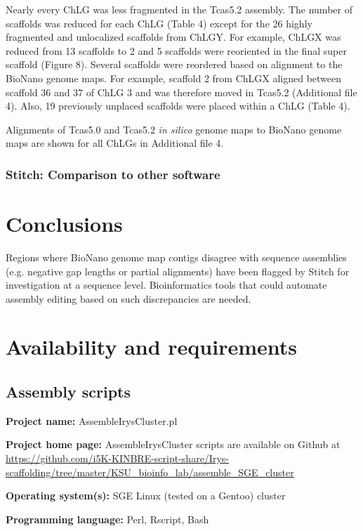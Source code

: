 \documentclass{bmcart}
\begin{document}
Nearly every ChLG was less fragmented in the Tcas5.2 assembly. The number of scaffolds was reduced for each ChLG (Table 4) except for the 26 highly fragmented and unlocalized scaffolds from ChLGY. For example, ChLGX was reduced from 13 scaffolds to 2 and 5 scaffolds were reoriented in the final super scaffold (Figure 8). Several scaffolds were reordered based on alignment to the BioNano genome maps. For example, scaffold 2 from ChLGX aligned between scaffold 36 and 37 of ChLG 3 and was therefore moved in Tcas5.2 (Additional file 4). Also, 19 previously unplaced scaffolds were placed within a ChLG (Table 4). 
 
Alignments of Tcas5.0 and Tcas5.2 \textit{in silico} genome maps to BioNano genome maps are shown for all ChLGs in Additional file 4.

\subsubsection*{Stitch: Comparison to other software}

\section*{Conclusions}

Regions where BioNano genome map contigs disagree with sequence assemblies (e.g. negative gap lengths or partial alignments) have been flagged by Stitch for investigation at a sequence level. Bioinformatics tools that could automate assembly editing based on such discrepancies are needed. 

\section*{Availability and requirements}

\subsection*{\textbf{Assembly scripts}}

\textbf{Project name:} AssembleIrysCluster.pl

\textbf{Project home page:} AssembleIrysCluster scripts are available on Github at \url{https://github.com/i5K-KINBRE-script-share/Irys-scaffolding/tree/master/KSU\_bioinfo\_lab/assemble\_SGE\_cluster}

\textbf{Operating system(s):} SGE Linux (tested on a Gentoo) cluster

\textbf{Programming language:} Perl, Rscript, Bash
\end{document}
